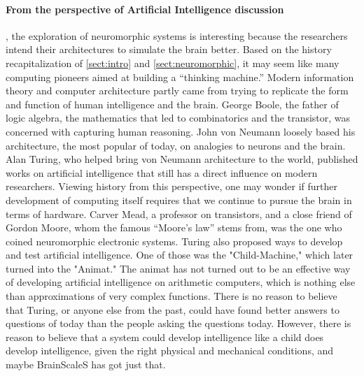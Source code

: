 \paragraph{From the perspective of Artificial Intelligence discussion}, the exploration of neuromorphic systems is interesting because the researchers intend their architectures to simulate the brain better.
Based on the history recapitalization of \vref{sect:intro} and \vref{sect:neuromorphic}, it may seem like many computing pioneers aimed at building a ``thinking machine.''
Modern information theory and computer architecture partly came from trying to replicate the form and function of human intelligence and the brain.
George Boole, the father of logic algebra, the mathematics that led to combinatorics and the transistor, was concerned with capturing human reasoning.
John von Neumann loosely based his architecture, the most popular of today, on analogies to neurons and the brain.
Alan Turing, who helped bring von Neumann architecture to the world, published works on artificial intelligence that still has a  direct influence on modern researchers.
Viewing history from this perspective, one may wonder if further development of computing itself requires that we continue to pursue the brain in terms of hardware.
Carver Mead, a professor on transistors, and a close friend of Gordon Moore, whom the famous ``Moore's law'' stems from, was the one who coined neuromorphic electronic systems.
Turing also proposed ways to develop and test artificial intelligence. One of those was the "Child-Machine," which later turned into the "Animat."
The animat has not turned out to be an effective way of developing artificial intelligence on arithmetic computers, which is nothing else than approximations of very complex functions.
There is no reason to believe that Turing, or anyone else from the past, could have found better answers to questions of today than the people asking the questions today.
However, there is reason to believe that a system could develop intelligence like a child does develop intelligence, given the right physical and mechanical conditions, and maybe BrainScaleS has got just that.







